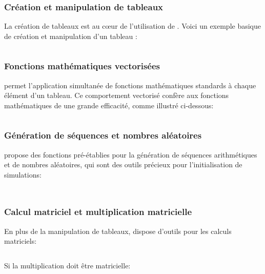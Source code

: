             \subsubsection{Création et manipulation de tableaux}
                La création de tableaux est au cœur de l'utilisation de . Voici un exemple basique de création et manipulation d'un tableau :
                \inputminted{python}{codes/np_array.py}

            \subsubsection{Fonctions mathématiques vectorisées}
                 permet l’application simultanée de fonctions mathématiques standards à chaque élément d’un tableau. Ce comportement vectorisé confère aux fonctions mathématiques de  une grande efficacité, comme illustré ci-dessous:
                \inputminted{python}{codes/np_math.py}
            
            \subsubsection{Génération de séquences et nombres aléatoires}
                 propose des fonctions pré-établies pour la génération de séquences arithmétiques et de nombres aléatoires, qui sont des outils précieux pour l'initialisation de simulations:
                \inputminted{python}{codes/np_init.py}
                \inputminted{python}{codes/np_random.py}
            
            \subsubsection{Calcul matriciel et multiplication matricielle}
                En plus de la manipulation de tableaux,  dispose d’outils pour les calculs matriciels:
                \inputminted{python}{codes/np_matrix.py}
                Si la multiplication doit être matricielle:
                \inputminted{python}{codes/np_matmul.py}
